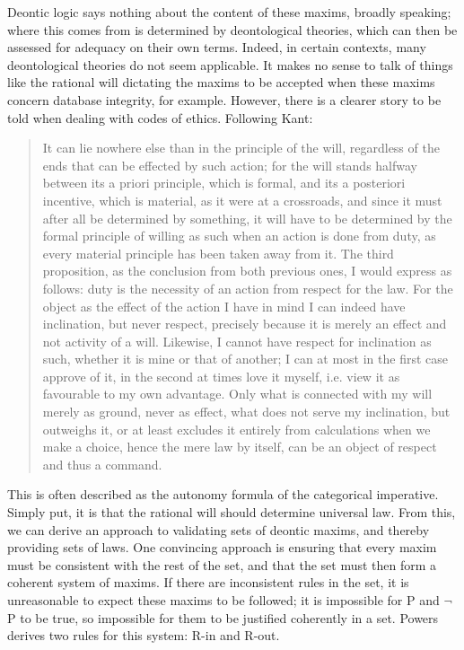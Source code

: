 \documentclass{l4proj}
\begin{document}
Deontic logic says nothing about the content of these maxims, broadly speaking; where this comes from is determined by deontological theories, which can then be assessed for adequacy on their own terms. Indeed, in certain contexts, many deontological theories do not seem applicable. It makes no sense to talk of things like the rational will dictating the maxims to be accepted when these maxims concern database integrity, for example. However, there is a clearer story to be told when dealing with codes of ethics. Following Kant\cite{groundwork}: 

\blockquote{It can lie nowhere else than in the principle of the will, regardless of the ends that can be effected by such action; for the will stands halfway between its a priori principle, which is formal, and its a posteriori incentive, which is material, as it were at a crossroads, and since it must after all be determined by something, it will have to be determined by the formal principle of willing as such when an action is done from duty, as every material principle has been taken away from it. The third proposition, as the conclusion from both previous ones, I would express as follows: duty is the necessity of an action from respect for the law. For the object as the effect of the action I have in mind I can indeed have inclination, but never respect, precisely because it is merely an effect and not activity of a will. Likewise, I cannot have respect for inclination as such, whether it is mine or that of another; I can at most in the first case approve of it, in the second at times love it myself, i.e. view it as favourable to my own advantage. Only what is connected with my will merely as ground, never as effect, what does not serve my inclination, but outweighs it, or at least excludes it entirely from calculations when we make a choice, hence the mere law by itself, can be an object of respect and thus a command.}

This is often described as the autonomy formula of the categorical imperative. Simply put, it is that the rational will should determine universal law. From this, we can derive an approach to validating sets of deontic maxims, and thereby providing sets of laws. One convincing approach is ensuring that every maxim must be consistent with the rest of the set, and that the set must then form a coherent system of maxims\cite{Powers}. If there are inconsistent rules in the set, it is unreasonable to expect these maxims to be followed; it is impossible for P and \( \neg \) P to be true, so impossible for them to be justified coherently in a set. Powers derives two rules for this system: R-in and R-out. 
\end{document}
